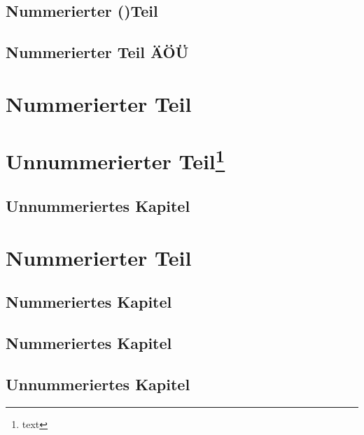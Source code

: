 \documentclass[ngerman,%
cd=full,%
tudscrver=2.05,%
cdoldfont=onlydin,
chapterprefix=true,
]{tudscrreprt}
\begin{document}
\chapter{Nummerierter ()Teil}

\chapter*{Nummerierter Teil ÄÖÜ}
\blindtext


\setcounter{secnumdepth}{-2}
\begingroup
{}
\part{Nummerierter Teil}
\endgroup
\setcounter{secnumdepth}{\subparagraphnumdepth}


\setpartpreamble{\blindtext}
\part*{Unnummerierter Teil\footnote{text}}
\setchapterpreamble{\blindtext}
\chapter*{Unnummeriertes Kapitel}
\setpartpreamble{\blindtext}
\setpartpreamble{\blindtext}

\part{Nummerierter Teil}
\setchapterpreamble{\blindtext}
\chapter{Nummeriertes Kapitel}
\setcounter{secnumdepth}{-2}
\begingroup
\setchapterpreamble{\blindtext}
\chapter{Nummeriertes Kapitel}
\endgroup
\setcounter{secnumdepth}{\subparagraphnumdepth}
\setchapterpreamble{\blindtext}
\chapter*{Unnummeriertes Kapitel}
\setchapterpreamble{\blindtext}
\blindtext
\setchapterpreamble{\begin{center}\blindtext\end{center}}
\blindtext
\end{document}
